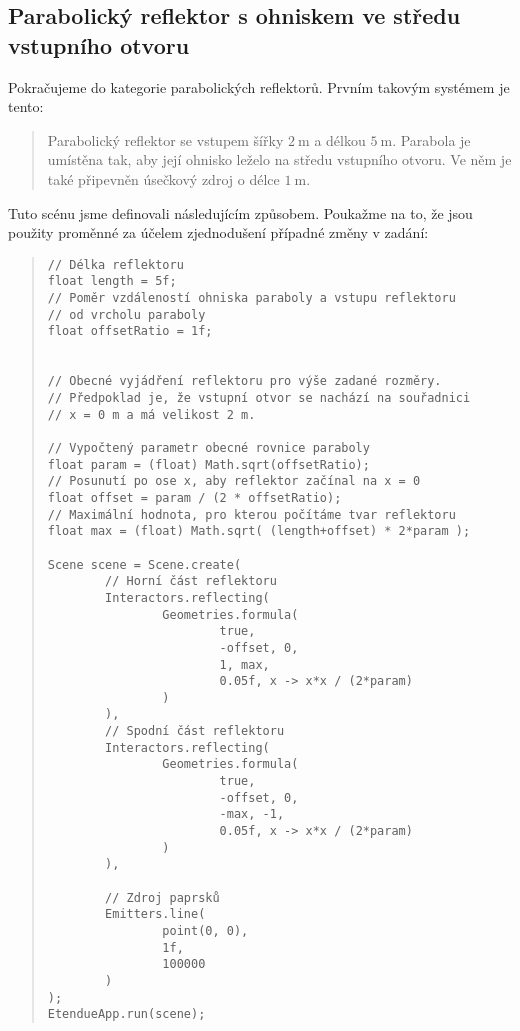 \subsection{Parabolický reflektor s ohniskem ve středu vstupního otvoru}

Pokračujeme do kategorie parabolických reflektorů. Prvním takovým systémem je tento:

\begin{quote}
    Parabolický reflektor se vstupem šířky $2\ \mathrm{m}$ a délkou $5\ \mathrm{m}$. Parabola je umístěna tak, aby její ohnisko leželo na středu vstupního otvoru. Ve něm je také připevněn úsečkový zdroj o délce $1\ \mathrm{m}$.
\end{quote}

Tuto scénu jsme definovali následujícím způsobem. Poukažme na to, že jsou použity proměnné za účelem zjednodušení případné změny v zadání:

\begin{minipage}{\textwidth}\begin{quote}\begin{lstlisting}
// Délka reflektoru
float length = 5f;
// Poměr vzdáleností ohniska paraboly a vstupu reflektoru
// od vrcholu paraboly
float offsetRatio = 1f;


// Obecné vyjádření reflektoru pro výše zadané rozměry.
// Předpoklad je, že vstupní otvor se nachází na souřadnici
// x = 0 m a má velikost 2 m.

// Vypočtený parametr obecné rovnice paraboly
float param = (float) Math.sqrt(offsetRatio);
// Posunutí po ose x, aby reflektor začínal na x = 0
float offset = param / (2 * offsetRatio);
// Maximální hodnota, pro kterou počítáme tvar reflektoru
float max = (float) Math.sqrt( (length+offset) * 2*param );

Scene scene = Scene.create(
        // Horní část reflektoru
        Interactors.reflecting(
                Geometries.formula(
                        true,
                        -offset, 0,
                        1, max,
                        0.05f, x -> x*x / (2*param)
                )
        ),
        // Spodní část reflektoru
        Interactors.reflecting(
                Geometries.formula(
                        true,
                        -offset, 0,
                        -max, -1,
                        0.05f, x -> x*x / (2*param)
                )
        ),

        // Zdroj paprsků
        Emitters.line(
                point(0, 0),
                1f,
                100000
        )
);
EtendueApp.run(scene);
\end{lstlisting}\end{quote}\end{minipage}

